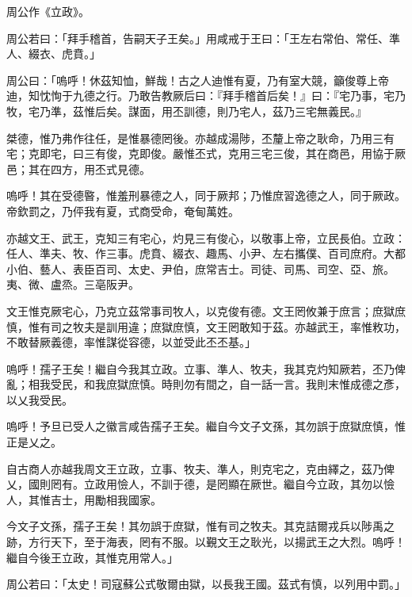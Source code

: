 
\begin{pinyinscope}
周公作《立政》。

周公若曰：「拜手稽首，告嗣天子王矣。」用咸戒于王曰：「王左右常伯、常任、準人、綴衣、虎賁。」

周公曰：「嗚呼！休茲知恤，鮮哉！古之人迪惟有夏，乃有室大競，籲俊尊上帝迪，知忱恂于九德之行。乃敢告教厥后曰：『拜手稽首后矣！』曰：『宅乃事，宅乃牧，宅乃準，茲惟后矣。謀面，用丕訓德，則乃宅人，茲乃三宅無義民。』

桀德，惟乃弗作往任，是惟暴德罔後。亦越成湯陟，丕釐上帝之耿命，乃用三有宅；克即宅，曰三有俊，克即俊。嚴惟丕式，克用三宅三俊，其在商邑，用協于厥邑；其在四方，用丕式見德。

嗚呼！其在受德暋，惟羞刑暴德之人，同于厥邦；乃惟庶習逸德之人，同于厥政。帝欽罰之，乃伻我有夏，式商受命，奄甸萬姓。

亦越文王、武王，克知三有宅心，灼見三有俊心，以敬事上帝，立民長伯。立政：任人、準夫、牧、作三事。虎賁、綴衣、趣馬、小尹、左右攜僕、百司庶府。大都小伯、藝人、表臣百司、太史、尹伯，庶常吉士。司徒、司馬、司空、亞、旅。夷、微、盧烝。三亳阪尹。

文王惟克厥宅心，乃克立茲常事司牧人，以克俊有德。文王罔攸兼于庶言；庶獄庶慎，惟有司之牧夫是訓用違；庶獄庶慎，文王罔敢知于茲。亦越武王，率惟敉功，不敢替厥義德，率惟謀從容德，以並受此丕丕基。」

嗚呼！孺子王矣！繼自今我其立政。立事、準人、牧夫，我其克灼知厥若，丕乃俾亂；相我受民，和我庶獄庶慎。時則勿有間之，自一話一言。我則末惟成德之彥，以乂我受民。

嗚呼！予旦已受人之徽言咸告孺子王矣。繼自今文子文孫，其勿誤于庶獄庶慎，惟正是乂之。

自古商人亦越我周文王立政，立事、牧夫、準人，則克宅之，克由繹之，茲乃俾乂，國則罔有。立政用憸人，不訓于德，是罔顯在厥世。繼自今立政，其勿以憸人，其惟吉士，用勵相我國家。

今文子文孫，孺子王矣！其勿誤于庶獄，惟有司之牧夫。其克詰爾戎兵以陟禹之跡，方行天下，至于海表，罔有不服。以覲文王之耿光，以揚武王之大烈。嗚呼！繼自今後王立政，其惟克用常人。」

周公若曰：「太史！司寇蘇公式敬爾由獄，以長我王國。茲式有慎，以列用中罰。」


\end{pinyinscope}